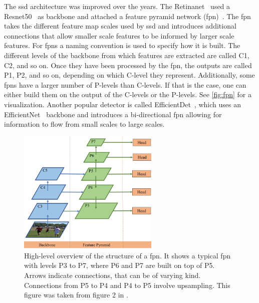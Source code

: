 The \acrshort{ssd} architecture was improved over the years. The Retinanet~\cite{Lin:2017aaa} used a Resnet50~\cite{He:2015aaa} as backbone and attached a feature pyramid network (\acrshort{fpn})~\cite{Qiao:2021aaa}. The \acrshort{fpn} takes the different feature map scales used by \acrshort{ssd} and introduces additional connections that allow smaller scale features to be informed by larger scale features. For \acrshort{fpn}s a naming convention is used to specify how it is built. The different levels of the backbone from which features are extracted are called C1, C2, and so on. Once they have been processed by the \acrshort{fpn}, the outputs are called P1, P2, and so on, depending on which C-level they represent. Additionally, some \acrshort{fpn}s have a larger number of P-levels than C-levels. If that is the case, one can either build them on the output of the C-levels or the P-levels. See \autoref{fig:fpn} for a visualization. Another popular detector is called EfficientDet~\cite{Tan:2019aaa}, which uses an EfficientNet~\cite{Tan:2019aab} backbone and introduces a bi-directional \acrshort{fpn} allowing for information to flow from small scales to large scales.
\begin{figure}
	\centering
	\includegraphics[width=0.6\textwidth]{chapters/internship/images/fpn.png}
	\caption[Feature pyramid network]{High-level overview of the structure of a \acrshort{fpn}. It shows a typical \acrshort{fpn} with levels P3 to P7, where P6 and P7 are built on top of P5. Arrows indicate connections, that can be of varying kind. Connections from P5 to P4 and P4 to P5 involve upsampling. This figure was taken from figure 2 in \cite{Tian:2019aaa}.}\label{fig:fpn}
\end{figure}


